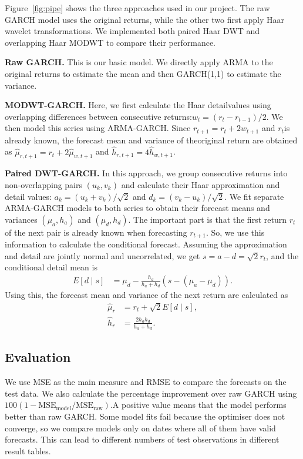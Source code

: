 \documentclass{article}
\begin{document}
Figure~\ref{fig:pipe} shows the three approaches used in our project. The raw GARCH model uses the original returns, while the other two first apply Haar wavelet transformations. We implemented both paired Haar DWT and overlapping Haar MODWT to compare their performance.

\textbf{Raw GARCH.} This is our basic model. We directly apply ARMA to the original returns to estimate the mean and then GARCH(1,1) to estimate the variance.

\textbf{MODWT-GARCH.} Here, we first calculate the Haar detailvalues using overlapping differences between consecutive returns:$w_t=(r_t-r_{t-1})/2$. We then model this series using ARMA-GARCH. Since $r_{t+1}=r_t+2w_{t+1}$ and $r_t$is already known, the forecast mean and variance of theoriginal return are obtained as $\hat{\mu}_{r,t+1}=r_t+2\hat{\mu}_{w,t+1}$ and
$\hat{h}_{r,t+1}=4\hat{h}_{w,t+1}$.


\textbf{Paired DWT-GARCH.} In this approach, we group consecutive returns into non-overlapping pairs $(u_k,v_k)$ and calculate their Haar approximation and detail values: $a_k=(u_k+v_k)/\sqrt{2}$ and
$d_k=(v_k-u_k)/\sqrt{2}$. We fit separate ARMA-GARCH models to both series to obtain their forecast means and variances $(\mu_a,h_a)$ and $(\mu_d,h_d)$. The important part is that the first return $r_t$ of the next pair is already known when forecasting $r_{t+1}$. So, we use this information to calculate
the conditional forecast. Assuming the approximation and detail are jointly normal and uncorrelated, we get $s=a-d=\sqrt{2}r_t$, and the conditional detail mean is
\begin{align}
E[d\mid s]
&=\mu_d-\frac{h_d}{h_a+h_d}
\left(s-(\mu_a-\mu_d)\right).
\end{align}
Using this, the forecast mean and variance of the next return are calculated as
\begin{align}
\hat{\mu}_r &= r_t+\sqrt{2}E[d\mid s],\\
\hat{h}_r &= \frac{2h_ah_d}{h_a+h_d}.
\end{align}



\subsection{Evaluation}
We use MSE as the main measure and RMSE
to compare the forecasts on the test data. We also calculate the percentage improvement over raw GARCH using $100(1-\mathrm{MSE}_{\text{model}}/\mathrm{MSE}_{\text{raw}})$.A positive value means that the model performs better than raw GARCH. Some model fits fail because the optimiser does
not converge, so we compare models only on dates where all
of them have valid forecasts. This can lead to different
numbers of test observations in different result tables.
\end{document}
